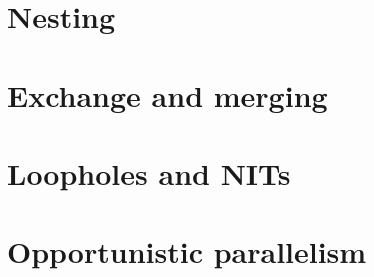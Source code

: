 \section{Nesting}
\section{Exchange and merging}
\section{Loopholes and NITs}
\section{Opportunistic parallelism}
